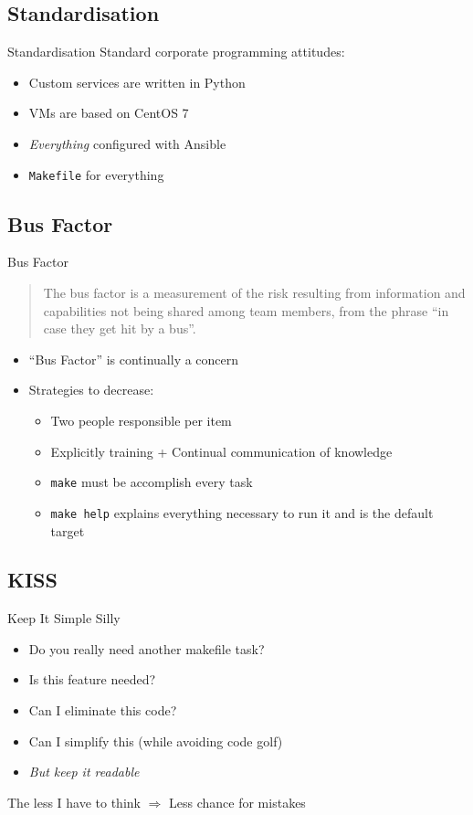 \documentclass[12pt]{ufrslides}
\begin{document}
\subsection{Standardisation}
\begin{frame}{Standardisation}
	Standard corporate programming attitudes:
	\begin{itemize}
		\item Custom services are written in Python
		\item VMs are based on CentOS 7
		\item \emph{Everything} configured with Ansible
		\item \texttt{Makefile} for everything
	\end{itemize}
\end{frame}

\subsection{Bus Factor}
\begin{frame}{Bus Factor}
	\begin{quote}
		The bus factor is a measurement of the risk resulting from information
		and capabilities not being shared among team members, from the phrase
		``in case they get hit by a bus''.\cite{wiki:Bus_factor}
	\end{quote}
	\vfill
	\begin{itemize}
		\item ``Bus Factor'' is continually a concern
		\item Strategies to decrease:
		\begin{itemize}
			\item Two people responsible per item
			\item Explicitly training + Continual communication of knowledge
			\item \texttt{make} must be accomplish every task
			\item \texttt{make help} explains everything necessary to run it
				and is the default target
		\end{itemize}
	\end{itemize}
\end{frame}

\subsection{KISS}
\begin{frame}{Keep It Simple Silly}
	\begin{itemize}
		\item Do you really need another makefile task?
		\item Is this feature needed?
		\item Can I eliminate this code?
		\item Can I simplify this (while avoiding code golf)
		\item \emph{But keep it readable}
	\end{itemize}
	\vfill
	The less I have to think $\Rightarrow$ Less chance for mistakes
\end{frame}
\end{document}
